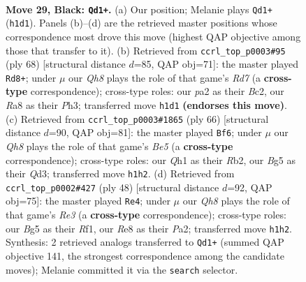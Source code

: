 \documentclass[11pt]{article}
\begin{document}
\clearpage

\begin{figure}[p]\centering
\begin{subfigure}{0.46\textwidth}\centering
\resizebox{\linewidth}{!}{%
\newchessgame
\chessboard[
  setfen={r3r3/1pp3kp/5p2/3p2b1/P5b1/N1BKP3/P4P2/RN5q b - - 0 29},
  showmover=false,
  pgfstyle=straightmove, color=movearrow, markmove={h1-d1}
]}
\caption{}
\end{subfigure}\hfill
\begin{subfigure}{0.46\textwidth}\centering
\resizebox{\linewidth}{!}{%
\newchessgame
\chessboard[
  setfen={6k1/1bBR1pb1/6pp/1r5n/2p1P1N1/7P/2B2PP1/6K1 w - - 10 35},
  showmover=false,
  pgfstyle=straightmove, color=movearrow, markmove={d7-d8}
]}
\caption{}
\end{subfigure}
\\[4pt]
\begin{subfigure}{0.46\textwidth}\centering
\resizebox{\linewidth}{!}{%
\newchessgame
\chessboard[
  setfen={1r1n4/1bp2q2/p1k5/2p1B1p1/2P5/3QP3/PR4P1/2K5 w - - 0 34},
  showmover=false,
  pgfstyle=straightmove, color=movearrow, markmove={e5-f6}
]}
\caption{}
\end{subfigure}\hfill
\begin{subfigure}{0.46\textwidth}\centering
\resizebox{\linewidth}{!}{%
\newchessgame
\chessboard[
  setfen={2rn1r2/pp2k2p/4p3/6p1/2P2PB1/4R1P1/P5P1/5RK1 w - - 1 25},
  showmover=false,
  pgfstyle=straightmove, color=movearrow, markmove={e3-e4}
]}
\caption{}
\end{subfigure}
\caption{\textbf{Move 29, Black: \texttt{Qd1+}.} (a) Our position; Melanie plays \texttt{Qd1+} (\texttt{h1d1}). Panels (b)--(d) are the retrieved master positions whose correspondence most drove this move (highest QAP objective among those that transfer to it). (b) Retrieved from \texttt{ccrl\_top\_p0003\#95} (ply 68) [structural distance $d$=85, QAP obj=71]: the master played \texttt{Rd8+}; under $\mu$ our \emph{Qh8} plays the role of that game's \emph{Rd7} (a \textbf{cross-type} correspondence); cross-type roles: our \emph{p}a2 as their \emph{B}c2, our \emph{R}a8 as their \emph{P}h3; transferred move \texttt{h1d1} \textbf{(endorses this move)}. (c) Retrieved from \texttt{ccrl\_top\_p0003\#1865} (ply 66) [structural distance $d$=90, QAP obj=81]: the master played \texttt{Bf6}; under $\mu$ our \emph{Qh8} plays the role of that game's \emph{Be5} (a \textbf{cross-type} correspondence); cross-type roles: our \emph{Q}h1 as their \emph{R}b2, our \emph{B}g5 as their \emph{Q}d3; transferred move \texttt{h1h2}. (d) Retrieved from \texttt{ccrl\_top\_p0002\#427} (ply 48) [structural distance $d$=92, QAP obj=75]: the master played \texttt{Re4}; under $\mu$ our \emph{Qh8} plays the role of that game's \emph{Re3} (a \textbf{cross-type} correspondence); cross-type roles: our \emph{B}g5 as their \emph{R}f1, our \emph{R}e8 as their \emph{P}a2; transferred move \texttt{h1h2}. Synthesis: 2 retrieved analogs transferred to \texttt{Qd1+} (summed QAP objective 141, the strongest correspondence among the candidate moves); Melanie committed it via the \texttt{search} selector.}
\label{fig:thought-m57}
\end{figure}
\end{document}
